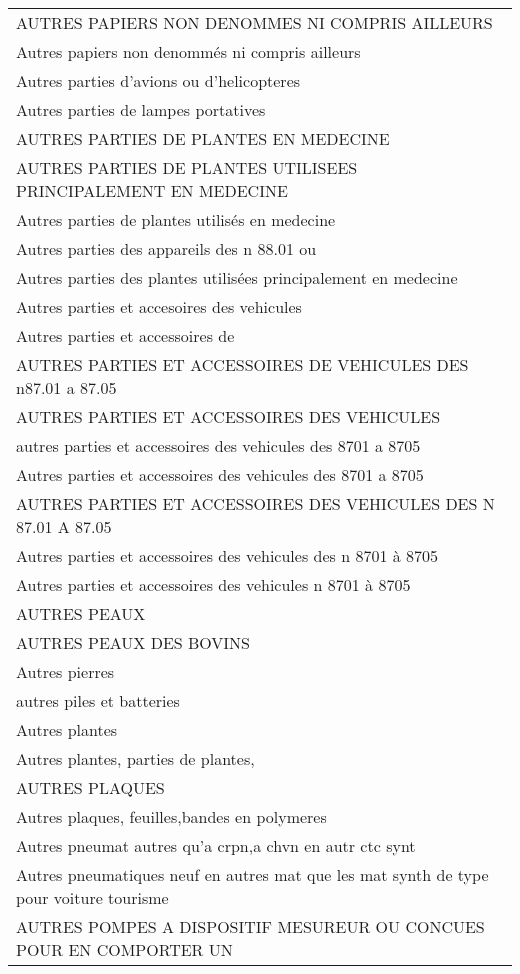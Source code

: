 \documentclass[
]{book}
\begin{document}
\begin{longtable}[t]{l}
AUTRES PAPIERS NON DENOMMES NI COMPRIS AILLEURS\\
Autres papiers non denommés ni compris ailleurs\\
Autres parties d'avions ou d'helicopteres\\
\addlinespace
Autres parties de lampes portatives\\
AUTRES PARTIES DE PLANTES EN MEDECINE\\
AUTRES PARTIES DE PLANTES UTILISEES PRINCIPALEMENT EN MEDECINE\\
Autres parties de plantes utilisés en medecine\\
Autres parties des appareils des n 88.01 ou\\
\addlinespace
Autres parties des plantes utilisées principalement en medecine\\
Autres parties et accesoires des vehicules\\
Autres parties et accessoires de\\
AUTRES PARTIES ET ACCESSOIRES DE VEHICULES DES n87.01 a 87.05\\
AUTRES PARTIES ET ACCESSOIRES DES VEHICULES\\
\addlinespace
autres parties et accessoires des vehicules des 8701 a 8705\\
Autres parties et accessoires des vehicules des 8701 a 8705\\
AUTRES PARTIES ET ACCESSOIRES DES VEHICULES DES N 87.01 A 87.05\\
Autres parties et accessoires des vehicules des n 8701 à 8705\\
Autres parties et accessoires des vehicules n 8701 à 8705\\
\addlinespace
AUTRES PEAUX\\
AUTRES PEAUX DES BOVINS\\
Autres pierres\\
autres piles et batteries\\
Autres plantes\\
\addlinespace
Autres plantes, parties de plantes,\\
AUTRES PLAQUES\\
Autres plaques, feuilles,bandes en polymeres\\
Autres pneumat autres qu'a crpn,a chvn en autr ctc synt\\
Autres pneumatiques neuf en autres mat que les mat synth de type pour voiture tourisme\\
\addlinespace
AUTRES POMPES A DISPOSITIF MESUREUR OU CONCUES POUR EN COMPORTER UN\\

\end{longtable}
\end{document}
